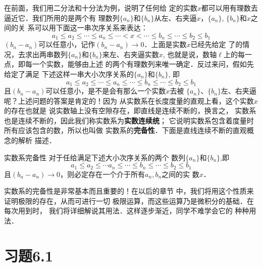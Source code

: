 在前面，我们用二分法和十分法为例，说明了任何给
定的实数$x$都可以用有理数去逼近它．我们所用的是两个有
理数列$\{a_n\}$和$\{b_n\}$从左、右夹逼$x$，$\{a_n\}$, $\{b_n\}$和$x$之间的关
系可以用下面这一串次序关系来表达：
\[a_1\le a_2\le\cdots\le a_n\le \cdots <x<\cdots\le b_n\le \cdots\le b_2\le b_1\]
$(b_n-a_n)$可以任意小，记作$(b_n-a_n)\to 0$．上面是实数$x$已经先给定
了的情况，去求出两串数列$\{a_n\}$和$\{b_n\}$来左、右夹逼实数$x$,
也就是说，数轴$\ell$上的每一点，即每一个实数，能够由上述
的两个有理数列来唯一确定．反过来问，假如先给定了满足
下述这样一串大小次序关系的$\{a_n\}$和$\{b_n\}$, 即
\[a_1\le a_2\le\cdots\le a_n\le \cdots \le b_n\le \cdots\le b_2\le b_1\]
且$(b_n-a_n)$可以任意小，是不是会有那么一个实数$x$去被
$\{a_n\}$、$\{b_n\}$左、右夹逼呢？上述问题的答案是肯定的！因为
从实数系在长度度量的直观上看，这个实数$x$的存在也就是
说实数轴上没有空隙存在，即直线是连续不断的，换言之，
实数系也是连续不断的，因此我们称实数系为\textbf{实数连续统}；
它说明实数系包含着度量时所有应该包含的数，所以也叫做
实数系的\textbf{完备性}．下面是直线连续不断的直观概念的解析
描述．

\begin{blk}{实数系完备性}
     对于任给满足下述大小次序关系的两个
数列$\{a_n\}$和$\{b_n\}$,即
\[a_1\le a_2\le \cdots a_n\le \cdots \le b_n\le \cdots \le b_2\le b_1\]
且$(b_n-a_n)\to 0$，则必定存在一个介于所有$a_n,b_n$之间的实
数$x$．
\end{blk}


实数系的完备性是非常基本而且重要的！在以后的章节
中，我们将用这个性质来证明极限的存在，从而可进行一切
极限运算，而这些运算乃是微积分的基础．在每次用到时，
我们将详细解说其用法．这样逐步渐近，同学不难学会它的
种种用法．

\section*{习题6.1}

